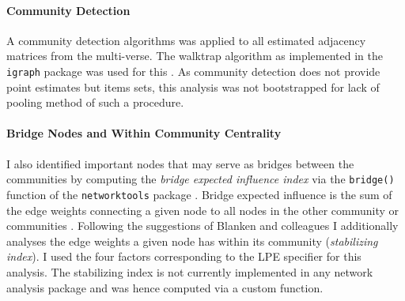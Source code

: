 \documentclass[a4paper,12pt]{article} %
\begin{document}
		\paragraph{Community Detection}
		A community detection algorithms was applied to all estimated adjacency matrices from the multi-verse.  The walktrap algorithm as implemented in the \texttt{igraph} package was used for this \parencite{igraph}. As community detection does not provide point estimates but items sets, this analysis was not bootstrapped for lack of pooling method of such a procedure.
		
		\paragraph{Bridge Nodes and Within Community Centrality}
		I also identified important nodes that may serve as bridges between the communities by computing the \textit{bridge expected influence index} via the \texttt{bridge()} function of the \texttt{networktools} package \parencite{networktools}.
		Bridge expected influence is the sum of the edge weights connecting a given node to all nodes in the other community or communities \parencite{jones_bridge_2019}.
		Following the suggestions of Blanken and colleagues \parencite*{blanken_role_2018} I additionally analyses the edge weights a given node has within its community (\textit{stabilizing index}). I used the four factors corresponding to the LPE specifier for this analysis. The stabilizing index is not currently implemented in any network analysis package and was hence computed via a custom function.


%
\end{document}
